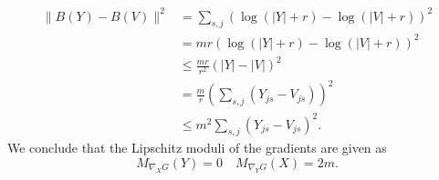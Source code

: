 \begin{align}
\|B(Y)-B(V)\|^2 &=\sum_{s,j}(\log(|Y|+r)-\log(|V|+r))^2\nonumber\\
&=mr(\log(|Y|+r)-\log(|V|+r))^2\nonumber\\
&\leq \frac{mr}{r^2}(|Y|-|V|)^2\nonumber\\
&= \frac{m}{r}\left(\sum_{s,j}(Y_{j s}-V_{j s})\right)^2\nonumber\\
&\leq m^2\sum_{s,j}(Y_{j s}-V_{j s})^2.\nonumber
\end{align}
We conclude that the Lipschitz moduli of the gradients are given as
\[M_{\nabla_X G}(Y)=0 \quad M_{\nabla_YG}(X)=2m.\]